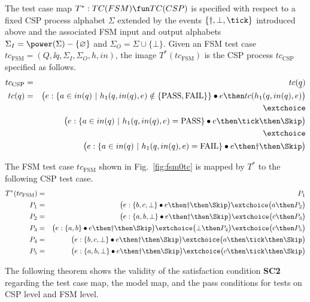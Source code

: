 The test case map $T^* :TC(FSM) \fun TC(CSP)$ is specified with respect to a fixed
CSP process alphabet $\Sigma$ extended by the events $\{\dag,\bot,\tick \}$ introduced
above
and the associated FSM input and output alphabets
$\Sigma_I = \power(\Sigma)-\{\varnothing\}$ and $\Sigma_O=\Sigma\cup \{\bot \}$.
Given an FSM test case $tc_\text{FSM}=(Q,\ii q,\Sigma_I,\Sigma_O,h,in)$, 
the image $T^*(tc_\text{FSM})$ is the CSP process $tc_\text{CSP}$ specified 
as follows.
\begin{eqnarray*}
tc_\text{CSP} & = & tc(\ii q)
\\
tc(q) & = & \big( e : \{ a\in in(q)~|~h_1(q,in(q),e)\notin \{\text{PASS},\text{FAIL}\} \} \bullet e \then tc(h_1(q,in(q),e) \big)
\\ & & \extchoice
\\ & & \big( e : \{ a\in in(q)~|~h_1(q,in(q),e) = \text{PASS} \} \bullet e \then \tick \then \Skip \big)
\\ & & \extchoice
\\ & & \big( e : \{ a\in in(q)~|~h_1(q,in(q),e) = \text{FAIL} \} \bullet e \then \dag \then \Skip \big)
\end{eqnarray*}


\begin{example}
The FSM test case $tc_\text{FSM}$
shown in Fig.~\ref{fig:fsm0tc} is mapped by $T^*$ to the following
CSP test case.
\begin{eqnarray*}
T^*(tc_\text{FSM}) & = & P_1
\\
P_1 & = & \big(e:\{ b,c,\bot \} \bullet e \then \dag\then\Skip\big)
\extchoice
 \big( a \then P_2 \big) 
\\
P_2 & = & \big( e : \{ a,b,\bot \}\bullet e\then \dag\then\Skip  \big)
\extchoice
\big( c\then P_3 \big)
\\
P_3 & = & \big( e : \{ a,b \}\bullet e\then \dag\then\Skip  \big)
\extchoice
\big( \bot \then P_4 \big)
\extchoice
\big( c\then P_5 \big)
\\
P_4 & = & \big( e : \{ b,c,\bot \}\bullet e\then \dag\then\Skip  \big)
\extchoice
\big( a\then\tick\then \Skip \big)
\\
P_5 & = & \big( e : \{ a,b,\bot \}\bullet e\then \dag\then\Skip  \big)
\extchoice
\big( c\then\tick\then \Skip \big)
\end{eqnarray*}
\xbox
\end{example}

The following theorem shows the validity of the satisfaction condition {\bf SC2}
regarding the test case map, the model map, and the pass conditions for tests on CSP level and FSM level.

